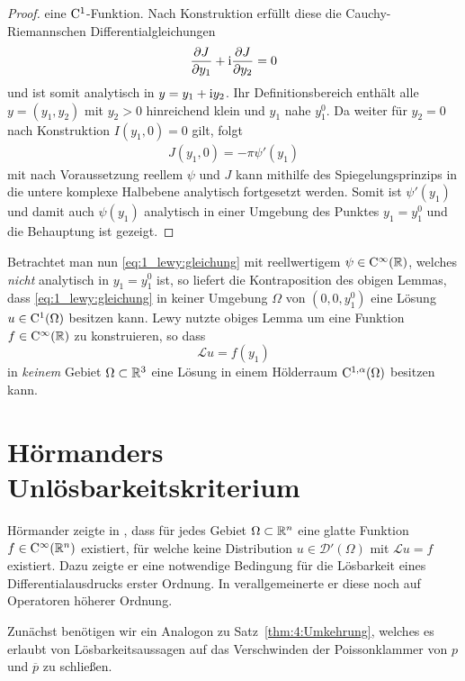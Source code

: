 \begin{proof}
eine $\mathrm C^1$-Funktion. Nach Konstruktion erfüllt diese die Cauchy-Riemannschen Differentialgleichungen
\begin{equation}
\frac{\partial J}{\partial y_1} +\mathrm i\frac{\partial J}{\partial y_2} = 0
\end{equation}
 und ist somit analytisch in $y=y_1+\mathrm i y_2$. Ihr Definitionsbereich enthält alle $y=(y_1,y_2)$ mit $y_2>0$ hinreichend klein und $y_1$ nahe $y_1^0$.
 Da weiter für $y_2=0$ nach Konstruktion $I(y_1,0)=0$ gilt, folgt
\begin{align*}
 J(y_1,0)=-\pi\psi'(y_1)
\end{align*}
mit nach Voraussetzung reellem $\psi$ und $J$ kann mithilfe des Spiegelungsprinzips in die untere komplexe Halbebene analytisch fortgesetzt werden. Somit ist $\psi'(y_1)$ 
und damit auch $\psi(y_1)$ analytisch in einer Umgebung des Punktes $y_1=y_1^0$ und die Behauptung ist gezeigt.
\end{proof}

Betrachtet man nun \eqref{eq:1_lewy:gleichung} mit reellwertigem $\psi\in \mathrm C^\infty(\mathbb R)$, welches \textit{nicht} analytisch in $y_1=y_1^0$ ist, so liefert die Kontraposition des obigen Lemmas, dass \eqref{eq:1_lewy:gleichung} in keiner Umgebung $\Omega$ von $(0,0,y_1^0)$ eine Lösung $u\in \mathrm C^1(\Omega)$ besitzen kann. Lewy nutzte obiges Lemma um eine Funktion $f\in\mathrm C^\infty(\mathbb R)$ zu konstruieren, so dass
\begin{equation} 
   \mathscr L u = f(y_1)
\end{equation}
in {\em keinem} Gebiet $\Omega\subset\mathbb R^3$ eine Lösung in einem Hölderraum $\mathrm C^{1,\alpha}(\Omega)$ besitzen kann.




\section{Hörmanders Unlösbarkeitskriterium}
Hörmander zeigte in \cite{Hormander:1960a}, dass für jedes Gebiet $\Omega\subset\mathbb R^n$ eine glatte Funktion $f\in\mathrm C^\infty(\mathbb R^n)$ existiert, für welche keine Distribution $u\in\mathscr{D}'(\Omega)$ mit $\mathscr Lu=f$ existiert. Dazu zeigte er eine notwendige Bedingung für die Lösbarkeit eines Differentialausdrucks erster Ordnung. In \cite{Hormander:1960b} verallgemeinerte er diese noch auf Operatoren höherer Ordnung.



Zunächst benötigen wir ein Analogon zu Satz~\ref{thm:4:Umkehrung}, welches es erlaubt von Lösbarkeitsaussagen auf das Verschwinden der Poissonklammer 
von $p$ und $\overline p$ zu schließen. 

